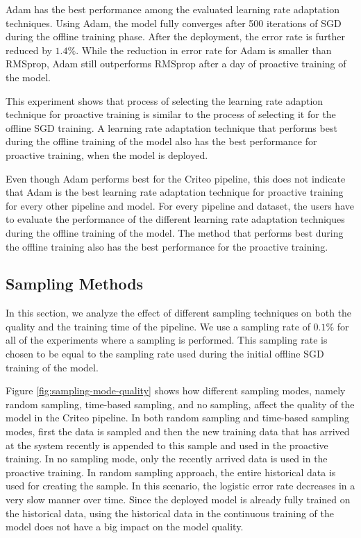 Adam has the best performance among the evaluated learning rate adaptation techniques.
Using Adam, the model fully converges after 500 iterations of SGD during the offline training phase.
After the deployment, the error rate is further reduced by $1.4\%$.
While the reduction in error rate for Adam is smaller than RMSprop, Adam still outperforms RMSprop after a day of proactive training of the model.

This experiment shows that process of selecting the learning rate adaption technique for proactive training is similar to the process of selecting it for the offline SGD training.
A learning rate adaptation technique that performs best during the offline training of the model also has the best performance for proactive training, when the model is deployed.

Even though Adam performs best for the Criteo pipeline, this does not indicate that Adam is the best learning rate adaptation technique for proactive training for every other pipeline and model.
For every pipeline and dataset, the users have to evaluate the performance of the different learning rate adaptation techniques during the offline training of the model.
The method that performs best during the offline training also has the best performance for the proactive training.

\subsection{Sampling Methods}
In this section, we analyze the effect of different sampling techniques on both the quality and the training time of the pipeline.
We use a sampling rate of $0.1\%$ for all of the experiments where a sampling is performed.
This sampling rate is chosen to be equal to the sampling rate used during the initial offline SGD training of the model.

Figure \ref{fig:sampling-mode-quality} shows how different sampling modes, namely random sampling, time-based sampling, and no sampling, affect the quality of the model in the Criteo pipeline.
In both random sampling and time-based sampling modes, first the data is sampled and then the new training data that has arrived at the system recently is appended to this sample and used in the proactive training.
In no sampling mode, only the recently arrived data is used in the proactive training.
In random sampling approach, the entire historical data is used for creating the sample.
In this scenario, the logistic error rate decreases in a very slow manner over time.
Since the deployed model is already fully trained on the historical data, using the historical data in the continuous training of the model does not have a big impact on the model quality.



